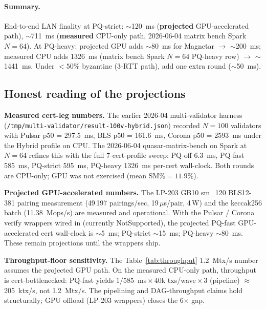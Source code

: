 \paragraph{Summary.} End-to-end LAN finality at PQ-strict:
$\sim$\SI{120}{\milli\second} (\textbf{projected} GPU-accelerated
path), $\sim$\SI{711}{\milli\second} (\textbf{measured} CPU-only
path, 2026-06-04 matrix bench Spark $N{=}64$). At PQ-heavy:
projected GPU adds $\sim$\SI{80}{\milli\second} for Magnetar
$\to$ $\sim$\SI{200}{\milli\second}; measured CPU adds
\SI{1326}{\milli\second} (matrix bench Spark $N{=}64$ PQ-heavy row)
$\to$ $\sim$\SI{1441}{\milli\second}. Under $<50\%$ byzantine
(3-RTT path), add one extra round ($\sim$\SI{50}{\milli\second}).

\subsection{Honest reading of the projections}

\textbf{Measured cert-leg numbers.} The earlier 2026-04
multi-validator harness (\texttt{/tmp/multi-validator/result-100v-hybrid.json})
recorded $N{=}100$ validators with Pulsar p50 = \SI{297.5}{\milli\second},
BLS p50 = \SI{161.6}{\milli\second}, Corona p50 = \SI{2593}{\milli\second}
under the Hybrid profile on CPU. The 2026-06-04 quasar-matrix-bench
on Spark at $N{=}64$ refines this with the full 7-cert-profile
sweep: PQ-off \SI{6.3}{\milli\second}, PQ-fast
\SI{585}{\milli\second}, PQ-strict \SI{595}{\milli\second}, PQ-heavy
\SI{1326}{\milli\second} per-cert wall-clock. Both rounds are CPU-only;
GPU was not exercised (mean SM\%${=}11.9\%$).

\textbf{Projected GPU-accelerated numbers.} The LP-203 GB10
sm\_120 BLS12-381 pairing measurement (49\,197 pairings/sec,
19\,$\mu$s/pair, 4\,W) and the keccak256 batch
(\SI{11.38}{\mega ops/s}) are measured and operational. With the
Pulsar / Corona verify wrappers wired in (currently NotSupported),
the projected PQ-fast GPU-accelerated cert wall-clock is
$\sim$\SI{5}{\milli\second}; PQ-strict $\sim$\SI{15}{\milli\second};
PQ-heavy $\sim$\SI{80}{\milli\second}. These remain projections
until the wrappers ship.

\textbf{Throughput-floor sensitivity.} The
Table~\ref{tab:throughput} \SI{1.2}{\mega tx/s} number assumes the
projected GPU path. On the measured CPU-only path, throughput is
cert-bottlenecked: PQ-fast yields
$1/$\SI{585}{\milli\second}${} \times 40$k txs/wave${} \times 3$
(pipeline) $\approx$ \SI{205}{\kilo tx/s}, not
\SI{1.2}{\mega tx/s}. The pipelining and DAG-throughput claims
hold structurally; GPU offload (LP-203 wrappers) closes the
6$\times$ gap.
